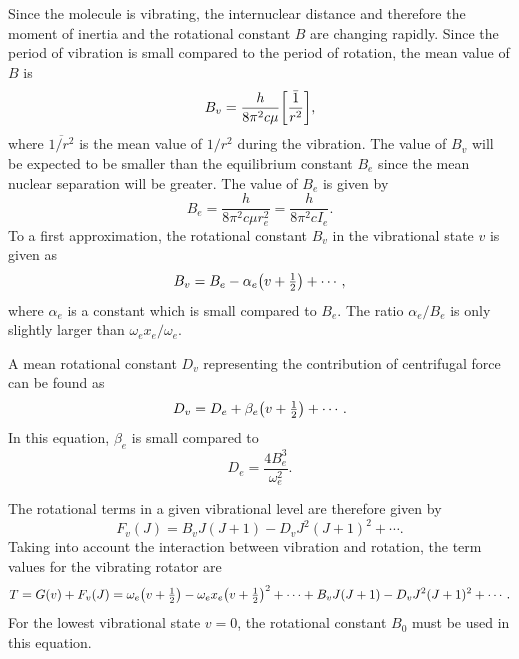 \documentclass[11pt, twoside, fleqn]{report}
\DeclareRobustCommand\_{\ifmmode\expandafter\subtxt\else\textunderscore\fi}
\DeclarePairedDelimiter\p{\lparen}{\rparen}
\DeclarePairedDelimiter\bk{\lbrack}{\rbrack}
\begin{document}
Since the molecule is vibrating, the internuclear distance and therefore the moment of inertia and the rotational constant $B$ are changing rapidly. Since the period of vibration is small compared to the period of rotation, the mean value of $B$ is
\begin{equation*}
    B_v = \frac{h}{8\pi^2c\mu}\bk*{\bar{\frac{1}{r^2}}},
\end{equation*}
where $\overline{1/r^2}$ is the mean value of $1/r^2$ during the vibration. The value of $B_v$ will be expected to be smaller than the equilibrium constant $B_e$ since the mean nuclear separation will be greater. The value of $B_e$ is given by
\begin{equation*}
    B_e = \frac{h}{8\pi^2c\mu{}r_e^2} = \frac{h}{8\pi^2cI_e}.
\end{equation*}
To a first approximation, the rotational constant $B_v$ in the vibrational state $v$ is given as
\begin{equation*}
    B_v = B_e - \alpha_e\p*{v + \tfrac{1}{2}} + \dotsb,
\end{equation*}
where $\alpha_e$ is a constant which is small compared to $B_e$. The ratio $\alpha_e/B_e$ is only slightly larger than $\omega_ex_e/\omega_e$.

A mean rotational constant $D_v$ representing the contribution of centrifugal force can be found as
\begin{equation*}
    D_v = D_e + \beta_e\p*{v + \tfrac{1}{2}} + \dotsb.
\end{equation*}
In this equation, $\beta_e$ is small compared to
\begin{equation*}
    D_e = \frac{4B_e^3}{\omega_e^2}.
\end{equation*}

The rotational terms in a given vibrational level are therefore given by
\begin{equation*}
    F_v(J) = B_vJ(J + 1) - D_vJ^2(J + 1)^2 + \dotsb.
\end{equation*}
Taking into account the interaction between vibration and rotation, the term values for the vibrating rotator are
\begin{equation*}
    T = G(v) + F_v(J) = \omega_e\p*{v + \tfrac{1}{2}} - \omega_ex_e\p*{v + \tfrac{1}{2}}^2 + \dotsb + B_vJ(J + 1) - D_vJ^2(J + 1)^2 + \dotsb.
\end{equation*}
For the lowest vibrational state $v = 0$, the rotational constant $B_0$ must be used in this equation.
\end{document}
